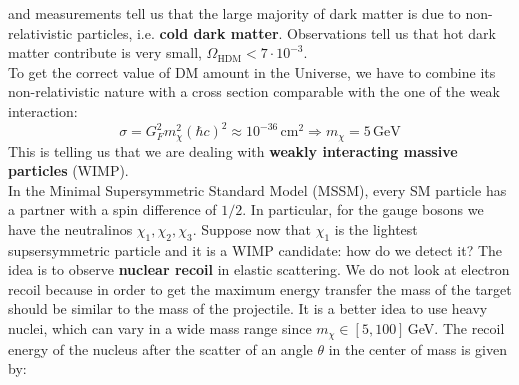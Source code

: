 \documentclass[10.75pt,a4paper,openright,bottom=2cm]{article}
\begin{document}
and measurements tell us that the large majority of dark matter is due to non-relativistic particles, i.e. \textbf{cold dark matter}. Observations tell us that hot dark matter contribute is very small, $\Omega_{\text{HDM}}<7\cdot10^{-3}$.\\
To get the correct value of DM amount in the Universe, we have to combine its non-relativistic nature with a cross section comparable with the one of the weak interaction:
\[
\sigma=G_F^2m_\chi^2(\hbar c)^2\approx10^{-36}\,\text{cm$^2$} \Rightarrow m_\chi=5\,\text{GeV}
\]
This is telling us that we are dealing with \textbf{weakly interacting massive particles} (WIMP).\\
In the Minimal Supersymmetric Standard Model (MSSM), every SM particle has a partner with a spin difference of $1/2$. In particular, for the gauge bosons we have the neutralinos $\chi_1, \chi_2, \chi_3$. Suppose now that $\chi_1$ is the lightest supsersymmetric particle and it is a WIMP candidate: how do we detect it? The idea is to observe \textbf{nuclear recoil} in elastic scattering. We do not look at electron recoil because in order to get the maximum energy transfer the mass of the target should be similar to the mass of the projectile. It is a better idea to use heavy nuclei, which can vary in a wide mass range since $m_\chi\in[5,100]$\,GeV. The recoil energy of the nucleus after the scatter of an angle $\theta$ in the center of mass is given by:
\end{document}
